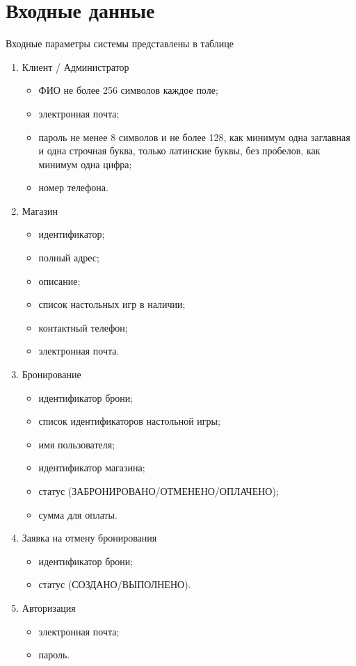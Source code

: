 \section*{Входные данные}
Входные параметры системы представлены в таблице 
\begin{enumerate}
    \item Клиент / Администратор 
    \begin{itemize}
        \item ФИО не более 256 символов каждое поле;
        \item электронная почта;
        \item пароль не менее 8 символов и не более 128, как минимум одна заглавная и одна строчная буква, только латинские буквы, без пробелов, как минимум одна цифра;
        \item номер телефона.
    \end{itemize}
    \item Магазин
    \begin{itemize}
        \item идентификатор;
        \item полный адрес;
        \item описание;
        \item список настольных игр в наличии;
        \item контактный телефон;
        \item электронная почта.
    \end{itemize}
    \item Бронирование
    \begin{itemize}
        \item идентификатор брони;
        \item список идентификаторов настольной игры;
        \item имя пользователя;
        \item идентификатор магазина;
        \item статус (ЗАБРОНИРОВАНО/ОТМЕНЕНО/ОПЛАЧЕНО);
        \item сумма для оплаты.
    \end{itemize}
    \item Заявка на отмену бронирования
	\begin{itemize}
		\item идентификатор брони;
		\item статус (СОЗДАНО/ВЫПОЛНЕНО).
	\end{itemize}
    \item Авторизация
    \begin{itemize}
        \item электронная почта;
        \item пароль.
    \end{itemize}
\end{enumerate}
	
